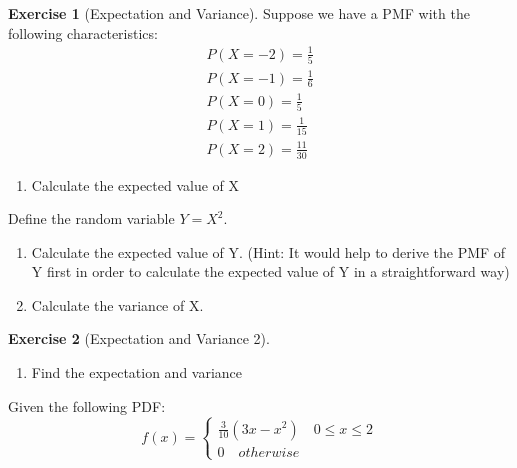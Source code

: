 \documentclass[
]{book}
\providecommand{\tightlist}{%
  \setlength{\itemsep}{0pt}\setlength{\parskip}{0pt}}
\theoremstyle{definition}
\theoremstyle{definition}
\theoremstyle{definition}
\newtheorem{exercise}{Exercise}[chapter]
\theoremstyle{definition}
\theoremstyle{remark}
\begin{document}
\begin{exercise}[Expectation and Variance]
\protect\hypertarget{exr:expvar}{}{\label{exr:expvar} {} }
Suppose we have a PMF with the following characteristics:
\begin{eqnarray*}
  P(X = -2) = \frac{1}{5}\\
  P(X = -1) = \frac{1}{6}\\
  P(X = 0) = \frac{1}{5}\\
  P(X = 1) = \frac{1}{15}\\
  P(X = 2) = \frac{11}{30}
\end{eqnarray*}

\begin{enumerate}
\def\labelenumi{\arabic{enumi}.}
\tightlist
\item
  Calculate the expected value of X
\end{enumerate}

Define the random variable \(Y = X^2\).

\begin{enumerate}
\def\labelenumi{\arabic{enumi}.}
\setcounter{enumi}{1}
\item
  Calculate the expected value of Y. (Hint: It would help to derive the PMF of Y first in order to calculate the expected value of Y in a straightforward way)
\item
  Calculate the variance of X.
\end{enumerate}
\end{exercise}

\begin{exercise}[Expectation and Variance 2]
\protect\hypertarget{exr:expvar2}{}{\label{exr:expvar2} {} }

\begin{enumerate}
\def\labelenumi{\arabic{enumi}.}
\tightlist
\item
  Find the expectation and variance
\end{enumerate}

Given the following PDF:
\[f(x) =  \begin{cases}
              \frac{3}{10}(3x - x^2) \quad 0 \leq x \leq 2\\
               0 \quad otherwise
            \end{cases}
               \]
\end{exercise}
\end{document}
